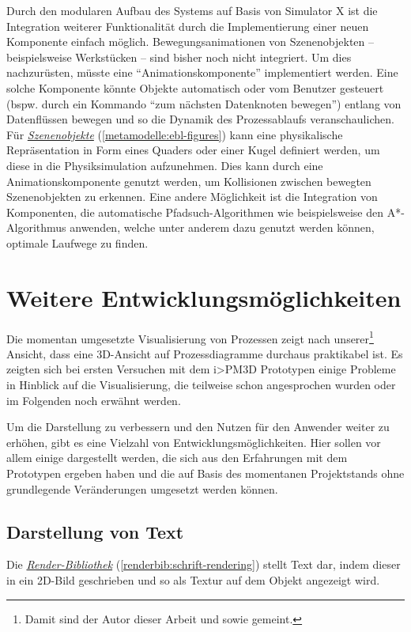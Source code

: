 \documentclass[a4paper,10pt]{sphinxmanual}
\begin{document}
Durch den modularen Aufbau des Systems auf Basis von Simulator X ist die Integration weiterer Funktionalität durch die Implementierung einer neuen Komponente einfach möglich.
Bewegungsanimationen von Szenenobjekten – beispielsweise Werkstücken – sind bisher noch nicht integriert. Um dies nachzurüsten, müsste eine "`Animationskomponente"' implementiert werden.
Eine solche Komponente könnte Objekte automatisch oder vom Benutzer gesteuert (bspw. durch ein Kommando "`zum nächsten Datenknoten bewegen"') entlang von Datenflüssen bewegen und so die Dynamik des Prozessablaufs veranschaulichen.
Für {\hyperref[metamodelle:ebl-figures]{\emph{Szenenobjekte}}} (\autoref*{metamodelle:ebl-figures}) kann eine physikalische Repräsentation in Form eines Quaders oder einer Kugel definiert werden, um diese in die Physiksimulation aufzunehmen.
Dies kann durch eine Animationskomponente genutzt werden, um Kollisionen zwischen bewegten Szenenobjekten zu erkennen.
Eine andere Möglichkeit ist die Integration von Komponenten, die automatische Pfadsuch-Algorithmen wie beispielsweise den A*-Algorithmus \cite{hart_correction_1972} anwenden, welche unter anderem dazu genutzt werden können, optimale Laufwege zu finden.


\section{Weitere Entwicklungsmöglichkeiten}
\label{visualisierung:weitere-entwicklungsmoglichkeiten}\label{visualisierung:vis-entwicklungsmoeglichkeiten}
Die momentan umgesetzte Visualisierung von Prozessen zeigt nach unserer\footnote{
Damit sind der Autor dieser Arbeit und \cite{uli} sowie \cite{buchi} gemeint.
} Ansicht, dass eine 3D-Ansicht auf Prozessdiagramme durchaus praktikabel ist.
Es zeigten sich bei ersten Versuchen mit dem i\textgreater{}PM3D Prototypen einige Probleme in Hinblick auf die Visualisierung, die teilweise schon angesprochen wurden oder im Folgenden noch erwähnt werden.

Um die Darstellung zu verbessern und den Nutzen für den Anwender weiter zu erhöhen, gibt es eine Vielzahl von Entwicklungsmöglichkeiten.
Hier sollen vor allem einige dargestellt werden, die sich aus den Erfahrungen mit dem Prototypen ergeben haben und die auf Basis des momentanen Projektstands ohne grundlegende Veränderungen umgesetzt werden können.


\subsection{Darstellung von Text}
\label{visualisierung:darstellung-von-text}
Die {\hyperref[renderbib:schrift-rendering]{\emph{Render-Bibliothek}}} (\autoref*{renderbib:schrift-rendering}) stellt Text dar, indem dieser in ein 2D-Bild geschrieben und so als Textur auf dem Objekt angezeigt wird.
\end{document}
